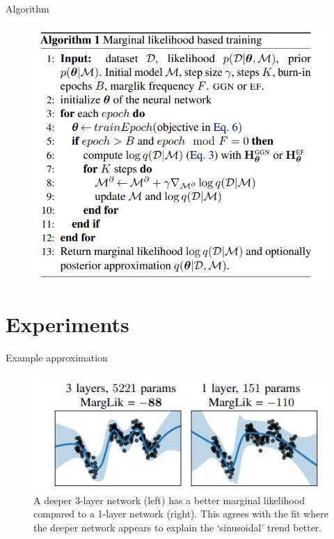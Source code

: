 \documentclass{beamer}
\begin{document}
\begin{frame}{Algorithm}
    \begin{figure}
        \centering
        \includegraphics[scale=0.7]{images/img_algorithm.png}
    \end{figure}
\end{frame}

\section{Experiments}
\begin{frame}{Example approximation}
    \begin{figure}
        \centering
        \includegraphics[scale=0.85]{images/example_1.png}
        \caption{A deeper 3-layer network (left) has a better
                marginal likelihood compared to a 1-layer network (right).
                This agrees with the fit where the deeper network appears to
                explain the ‘sinusoidal’ trend better.}
        \label{fig:enter-label}
    \end{figure}
\end{frame}
\end{document}
